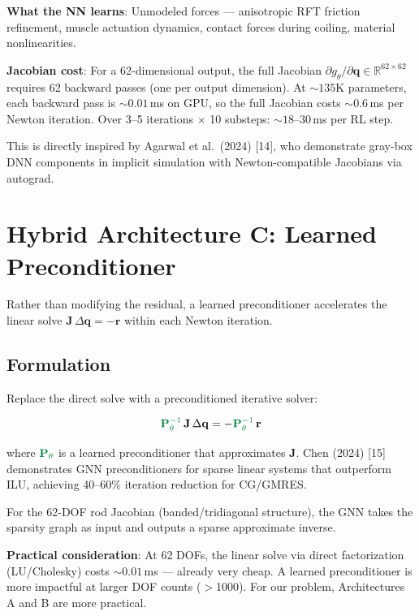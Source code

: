 \documentclass[11pt]{article}
\newcommand{\vect}[1]{\mathbf{#1}}
\newcommand{\mat}[1]{\mathbf{#1}}
\newcommand{\Real}{\mathbb{R}}
\newcommand{\nn}[1]{{\color{nngreen}#1}}
\begin{document}
\noindent
\textbf{What the NN learns}: Unmodeled forces --- anisotropic RFT friction refinement, muscle actuation dynamics, contact forces during coiling, material nonlinearities.

\textbf{Jacobian cost}: For a 62-dimensional output, the full Jacobian $\partial g_\theta/\partial \vect{q} \in \Real^{62 \times 62}$ requires 62 backward passes (one per output dimension).
At ${\sim}135$K parameters, each backward pass is ${\sim}0.01$\,ms on GPU, so the full Jacobian costs ${\sim}0.6$\,ms per Newton iteration.
Over 3--5 iterations $\times$ 10 substeps: ${\sim}18$--$30$\,ms per RL step.

This is directly inspired by Agarwal et al.\ (2024) [14], who demonstrate gray-box DNN components in implicit simulation with Newton-compatible Jacobians via autograd.


\section{Hybrid Architecture C: Learned Preconditioner}
\label{sec:preconditioner}

Rather than modifying the residual, a learned preconditioner accelerates the linear solve $\mat{J}\,\Delta\vect{q} = -\vect{r}$ within each Newton iteration.

\subsection{Formulation}

Replace the direct solve with a preconditioned iterative solver:

\begin{equation}
  \nn{\mat{P}_\theta^{-1}}\,\mat{J}\,\Delta\vect{q} = -\nn{\mat{P}_\theta^{-1}}\,\vect{r}
  \label{eq:preconditioned}
\end{equation}

\noindent
where $\nn{\mat{P}_\theta}$ is a learned preconditioner that approximates $\mat{J}$.
Chen (2024) [15] demonstrates GNN preconditioners for sparse linear systems that outperform ILU, achieving 40--60\% iteration reduction for CG/GMRES.

For the 62-DOF rod Jacobian (banded/tridiagonal structure), the GNN takes the sparsity graph as input and outputs a sparse approximate inverse.

\textbf{Practical consideration}: At 62 DOFs, the linear solve via direct factorization (LU/Cholesky) costs ${\sim}0.01$\,ms --- already very cheap.
A learned preconditioner is more impactful at larger DOF counts ($>$1000).
For our problem, Architectures A and B are more practical.
\end{document}
